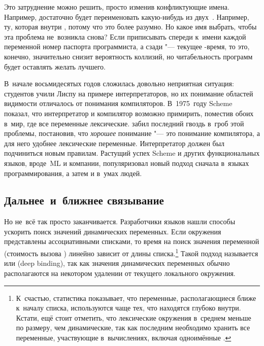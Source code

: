 Это затруднение можно решить, просто изменив конфликтующие имена. Например,
достаточно будет переименовать какую-нибудь из двух~. Например, ту,
которая внутри , потому что это более разумно. Но какое имя выбрать,
чтобы эта проблема не~возникла снова? Если приписывать спереди к~имени каждой
переменной номер паспорта программиста, а сзади "--- текущее \UNIX-время, то
это, конечно, значительно снизит вероятность коллизий, но читабельность программ
будет оставлять желать лучшего.

В~начале восьмидесятых годов сложилась довольно неприятная ситуация: студентов
учили Лиспу на примере интерпретаторов, но их понимание областей видимости
отличалось от понимания компиляторов. В~1975~году Scheme \cite{ss75} показал,
что интерпретатор и компилятор возможно примирить, поместив обоих в~мир, где все
переменные лексические. {\CommonLisp} забил последний гвоздь в~гроб этой
проблемы, постановив, что \emph{хорошее} понимание "--- это понимание
компилятора, а для него удобнее лексические переменные. Интерпретатор должен
был подчиниться новым правилам. Растущий успех Scheme и других функциональных
языков, вроде~ML и компании, популяризовал новый подход сначала в~языках
программирования, а затем и в~умах людей.


\subsection{Дальнее~и~ближнее связывание}%
\label{basics/representing-functions/ssect:deep-or-shallow}

Но не~всё так просто заканчивается. Разработчики языков нашли способы ускорить
поиск значений динамических переменных. Если окружения представлены
ассоциативными списками, то время на поиск значения переменной (стоимость вызова
) линейно зависит от длины списка.\footnote*{К~счастью, статистика
показывает, что переменные, располагающиеся ближе к~началу списка, используются
чаще тех, что находятся глубоко внутри. Кстати, ещё стоит отметить, что
лексические окружения в~среднем меньше по размеру, чем динамические, так как
последним необходимо хранить все переменные, участвующие в~вычислениях, включая
одноимённые \cite{bak92a}.} Такой подход называется  или
 (deep binding), так как значения динамических
переменных обычно располагаются на некотором удалении от текущего локального
окружения.

